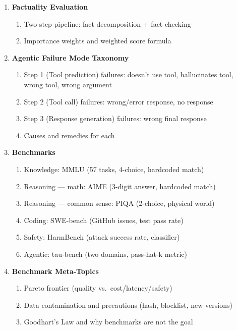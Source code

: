 \documentclass[11pt, a4paper]{article}
\begin{document}
\begin{enumerate}[label=\textbf{\arabic*.}, leftmargin=2em]
  \item \textbf{Factuality Evaluation}
    \begin{enumerate}[label=\arabic{enumi}.\arabic*]
      \item Two-step pipeline: fact decomposition + fact checking
      \item Importance weights and weighted score formula
    \end{enumerate}

  \item \textbf{Agentic Failure Mode Taxonomy}
    \begin{enumerate}[label=\arabic{enumi}.\arabic*]
      \item Step 1 (Tool prediction) failures: doesn't use tool, hallucinates tool, wrong tool, wrong argument
      \item Step 2 (Tool call) failures: wrong/error response, no response
      \item Step 3 (Response generation) failures: wrong final response
      \item Causes and remedies for each
    \end{enumerate}

  \item \textbf{Benchmarks}
    \begin{enumerate}[label=\arabic{enumi}.\arabic*]
      \item Knowledge: MMLU (57 tasks, 4-choice, hardcoded match)
      \item Reasoning --- math: AIME (3-digit answer, hardcoded match)
      \item Reasoning --- common sense: PIQA (2-choice, physical world)
      \item Coding: SWE-bench (GitHub issues, test pass rate)
      \item Safety: HarmBench (attack success rate, classifier)
      \item Agentic: tau-bench (two domains, pass-hat-k metric)
    \end{enumerate}

  \item \textbf{Benchmark Meta-Topics}
    \begin{enumerate}[label=\arabic{enumi}.\arabic*]
      \item Pareto frontier (quality vs.\ cost/latency/safety)
      \item Data contamination and precautions (hash, blocklist, new versions)
      \item Goodhart's Law and why benchmarks are not the goal
    \end{enumerate}
\end{enumerate}
\end{document}
